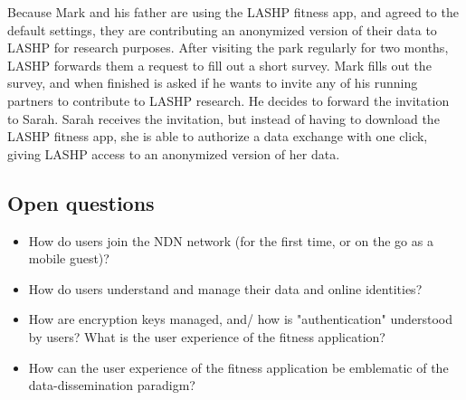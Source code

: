 Because Mark and his father are using the LASHP fitness app, and agreed to the default settings, they are contributing an anonymized version of their data to LASHP for research purposes. After visiting the park regularly for two months, LASHP forwards them a request to fill out a short survey. Mark fills out the survey, and when finished is asked if he wants to invite any of his running partners to contribute to LASHP research. He decides to forward the invitation to Sarah. Sarah receives the invitation, but instead of having to download the LASHP fitness app, she is able to authorize a data exchange with one click, giving LASHP access to an anonymized version of her data. 

\subsection{Open questions}
\begin{itemize}
\item How do users join the NDN network (for the first time, or on the go as a mobile guest)? 
\item How do users understand and manage their data and online identities? 
\item How are encryption keys managed, and/ how is "authentication" understood by users? What is the user experience of the fitness application?  
\item How can the user experience of the fitness application be emblematic of the data-dissemination paradigm?  
\end{itemize} 


